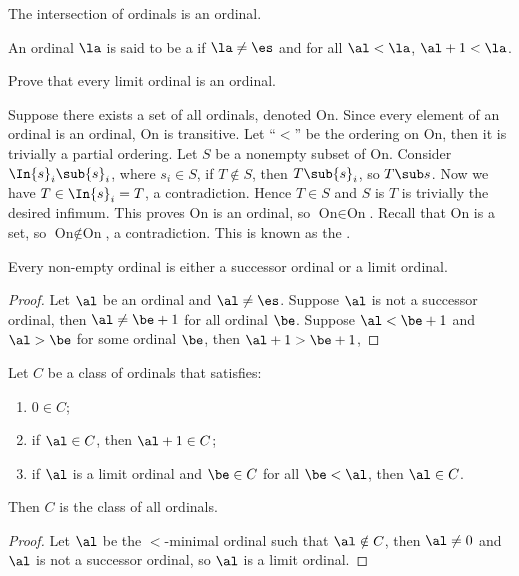 \documentclass[10pt]{article}
\begin{document}
\begin{problem}
    The intersection of ordinals is an ordinal.
\end{problem}
\begin{definition}
    An ordinal $\la$ is said to be a  if $\la\ne\es$ and for all $\al<\la$, $\al+1<\la$.
\end{definition}
\begin{problem}
    Prove that every limit ordinal is an ordinal.
\end{problem}
\par
Suppose there exists a set of all ordinals, denoted $\text{On}$. Since every element of an ordinal is an ordinal, $\text{On}$ is transitive. Let ``$<$'' be the ordering on $\text{On}$, then it is trivially a partial ordering. Let $S$ be a nonempty subset of $\text{On}$. Consider $\In{s}_{i}\sub{s}_{i}$, where ${s}_{i}\in S$, if $T\notin S$, then $T\sub{s}_{i}$, so $T\sub s$. Now we have $T\in\In{s}_{i}=T$, a contradiction. Hence $T\in S$ and $S$ is $T$ is trivially the desired infimum. This proves $\text{On}$ is an ordinal, so $\text{On}\in\text{On}$. Recall that $\text{On}$ is a set, so $\text{On}\notin\text{On}$, a contradiction. This is known as the .
\begin{proposition}
    Every non-empty ordinal is either a successor ordinal or a limit ordinal.
\end{proposition}
\begin{proof}
    Let $\al$ be an ordinal and $\al\ne\es$. Suppose $\al$ is not a successor ordinal, then $\al\ne\be+1$ for all ordinal $\be$. Suppose $\al<\be+1$ and $\al>\be$ for some ordinal $\be$, then $\al+1>\be+1$, 
\end{proof}
\begin{theorem}
    Let $C$ be a class of ordinals that satisfies:
    \begin{enumerate}
        \item $0\in C$;
        \item if $\al\in C$, then $\al+1\in C$;
        \item if $\al$ is a limit ordinal and $\be\in C$ for all $\be<\al$, then $\al\in C$.
    \end{enumerate}
    Then $C$ is the class of all ordinals.
\end{theorem}
\begin{proof}
    Let $\al$ be the $<$-minimal ordinal such that $\al\notin C$, then $\al\ne 0$ and $\al$ is not a successor ordinal, so $\al$ is a limit ordinal. 
\end{proof}
\end{document}
